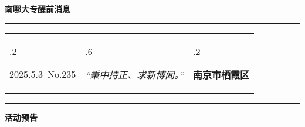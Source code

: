 \documentclass[letterpaper, 12pt]{article}
\begin{document}
\begin{center}
    \Huge\textbf{南哪大专醒前消息}
\end{center}
\vspace{4mm}
\hrule
\renewcommand\tabularxcolumn[1]{m{#1}}
\begin{tabularx}{\textwidth}{>{\hsize.2\hsize}X>{\hsize.6\hsize}X>{\hsize.2\hsize}X}
    \begin{flushleft}
        2025.5.3\, No.235
    \end{flushleft}
    &
    \begin{center}
        \textit{“秉中持正、求新博闻。”}
    \end{center}
    &
    \begin{flushright}
        \textbf{南京市栖霞区}
    \end{flushright}
\end{tabularx}
\vspace{-3.5mm}
\hrule
\vspace{4mm}
\centerline{\huge\textbf{活动预告}}
\end{document}

